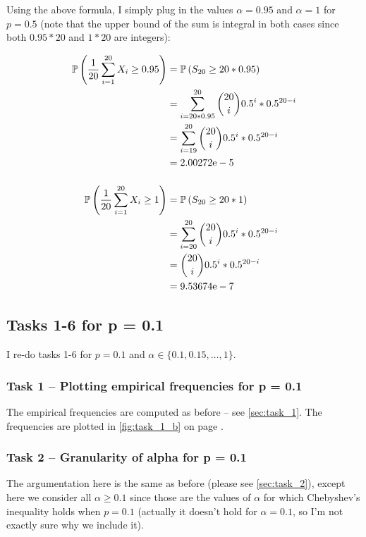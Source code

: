 
Using the above formula, I simply plug in the values $\alpha = 0.95$ and $\alpha
= 1$ for $p = 0.5$ (note that the upper bound of the sum is integral in both
cases since both $0.95 * 20$ and $1 * 20$ are integers):

\begin{align*}
  \mathbb P \left(\frac{1}{20}\sum_{i = 1}^{20} X_i \geq 0.95\right) &= \mathbb P \left(S_{20} \geq
  20 * 0.95\right)\\
  &= \sum_{i = 20 * 0.95}^{20} \binom{20}{i} 0.5^i * 0.5^{20 - i}\\
  &= \sum_{i = 19}^{20} \binom{20}{i} 0.5^i * 0.5^{20 - i}\\
  &= 2.00272\text{e}-5\\[12pt]
  \mathbb P \left(\frac{1}{20}\sum_{i = 1}^{20} X_i \geq 1\right) &= \mathbb P \left(S_{20} \geq
  20 * 1\right)\\
  &= \sum_{i = 20}^{20} \binom{20}{i} 0.5^i * 0.5^{20 - i}\\
  &= \binom{20}{i} 0.5^i * 0.5^{20 - i}\\
  &= 9.53674\text{e}-7
\end{align*}

\subsection{Tasks 1-6 for p = 0.1}

I re-do tasks 1-6 for $p = 0.1$ and $\alpha \in \{0.1, 0.15, \dots, 1\}$.

\subsubsection{Task 1 -- Plotting empirical frequencies for p = 0.1}

The empirical frequencies are computed as before -- see \cref{sec:task_1}. The
frequencies are plotted in \cref{fig:task_1_b} on page \pageref{fig:task_1_b}.

\subsubsection{Task 2 -- Granularity of alpha for p = 0.1}

The argumentation here is the same as before (please see \cref{sec:task_2}),
except here we consider all $\alpha \geq 0.1$ since those are the values of
$\alpha$ for which Chebyshev's inequality holds when $p = 0.1$ (actually it
doesn't hold for $\alpha = 0.1$, so I'm not exactly sure why we include it).


